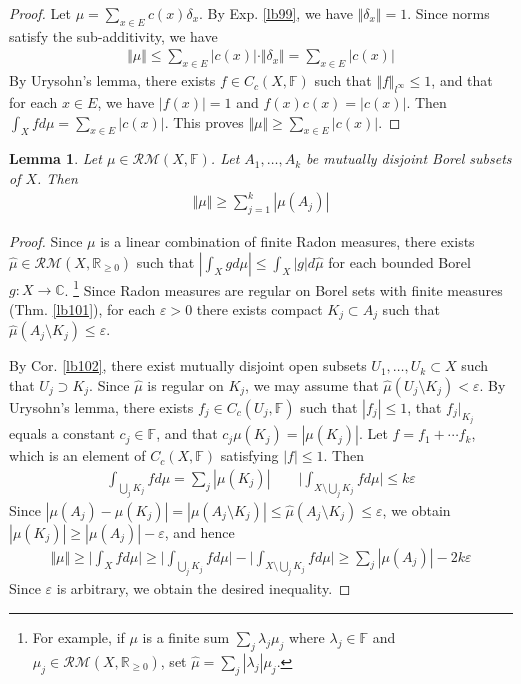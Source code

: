 \documentclass[12pt,b5paper,notitlepage]{article}
\theoremstyle{definition}
\theoremstyle{plain}
\newtheorem{lm}[df]{Lemma}
\newcommand{\wht}{\widehat}
\newcommand{\Cbb}{\mathbb C}
\newcommand{\Rbb}{\mathbb R}
\newcommand{\Fbb}{\mathbb F}
\newcommand{\eps}{\varepsilon}
\newcommand{\RM}{\mathcal {RM}}
\numberwithin{equation}{section}
\begin{document}
\begin{proof}
Let $\mu=\sum_{x\in E}c(x)\delta_x$. By Exp. \ref{lb99}, we have $\Vert\delta_x\Vert=1$. Since norms satisfy the sub-additivity, we have
\begin{align*}
\Vert\mu\Vert\leq\sum_{x\in E}|c(x)|\cdot\Vert\delta_x\Vert=\sum_{x\in E}|c(x)|
\end{align*}
By Urysohn's lemma, there exists $f\in C_c(X,\Fbb)$ such that $\Vert f\Vert_{l^\infty}\leq 1$, and that for each $x\in E$, we have $|f(x)|=1$ and $f(x)c(x)=|c(x)|$. Then $\int_X fd\mu=\sum_{x\in E}|c(x)|$. This proves $\Vert\mu\Vert\geq\sum_{x\in E}|c(x)|$.
\end{proof}


\begin{lm}\label{lb104}
Let $\mu\in\RM(X,\Fbb)$. Let $A_1,\dots,A_k$ be mutually disjoint Borel subsets of $X$. Then
\begin{align*}
\Vert\mu\Vert\geq\sum_{j=1}^k |\mu(A_j)|
\end{align*}
\end{lm}

\begin{proof}
Since $\mu$ is a linear combination of finite Radon measures, there exists $\wht\mu\in\RM(X,\Rbb_{\geq0})$ such that $|\int_X gd\mu|\leq\int_X|g|d\wht\mu$ for each bounded Borel $g:X\rightarrow\Cbb$. \footnote{For example, if $\mu$ is a finite sum $\sum_j\lambda_j\mu_j$ where $\lambda_j\in\Fbb$ and $\mu_j\in\RM(X,\Rbb_{\geq0})$, set $\wht\mu=\sum_j|\lambda_j|\mu_j$.} Since Radon measures are regular on Borel sets with finite measures (Thm. \ref{lb101}), for each $\eps>0$ there exists compact $K_j\subset A_j$ such that $\wht\mu(A_j\setminus K_j)\leq \eps$. 

By Cor. \ref{lb102}, there exist mutually disjoint open subsets $U_1,\dots,U_k\subset X$ such that $U_j\supset K_j$. Since $\wht\mu$ is regular on $K_j$, we may assume that $\wht\mu(U_j\setminus K_j)<\eps$. By Urysohn's lemma, there exists $f_j\in C_c(U_j,\Fbb)$ such that $|f_j|\leq 1$, that $f_j|_{K_j}$ equals a constant $c_j\in\Fbb$, and that $c_j\mu(K_j)=|\mu(K_j)|$. Let $f=f_1+\cdots f_k$, which is an element of $C_c(X,\Fbb)$ satisfying $|f|\leq 1$. Then 
\begin{align*}
\int_{\bigcup_j K_j}fd\mu=\sum_j|\mu(K_j)|\qquad \Big|\int_{X\setminus\bigcup_j K_j} fd\mu\Big|\leq k\eps
\end{align*}
Since $|\mu(A_j)-\mu(K_j)|=|\mu(A_j\setminus K_j)|\leq\wht\mu(A_j\setminus K_j)\leq\eps$, we obtain $|\mu(K_j)|\geq |\mu(A_j)|-\eps$, and hence
\begin{align*}
\Vert\mu\Vert\geq\Big|\int_X fd\mu\Big|\geq\Big|\int_{\bigcup_j K_j}fd\mu\Big|-\Big|\int_{X\setminus\bigcup_j K_j} fd\mu \Big|\geq \sum_j |\mu(A_j)|-2k\eps
\end{align*}
Since $\eps$ is arbitrary, we obtain the desired inequality.
\end{proof}
\end{document}
